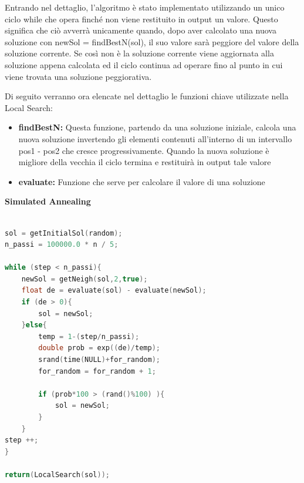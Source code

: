 \documentclass[preprint,12pt]{elsarticle}
\begin{document}
Entrando nel dettaglio, l'algoritmo è stato implementato utilizzando un unico ciclo while che opera finché non viene restituito in output un valore. Questo significa che ciò avverrà unicamente quando, dopo aver calcolato una nuova soluzione con newSol = findBestN(sol), il suo valore sarà peggiore del valore della soluzione corrente. Se così non è la soluzione corrente viene aggiornata alla soluzione appena calcolata ed il ciclo continua ad operare fino al punto in cui viene trovata una soluzione peggiorativa. 

Di seguito verranno ora elencate nel dettaglio le funzioni chiave utilizzate nella Local Search:

\begin{itemize}
\item \textbf{findBestN:} Questa funzione, partendo da una soluzione iniziale, calcola una nuova soluzione invertendo gli elementi contenuti all'interno di un intervallo pos1 - pos2 che cresce progressivamente. Quando la nuova soluzione è migliore della vecchia il ciclo termina e restituirà in output tale valore
\item \textbf{evaluate:} Funzione che serve per calcolare il valore di una soluzione 
\end{itemize}

\begin{large}
\textbf{Simulated Annealing}
\end{large}


\begin{lstlisting}[basicstyle=\small, caption={Simulated Annealing}, frame=single, language=C++]

sol = getInitialSol(random);
n_passi = 100000.0 * n / 5;

while (step < n_passi){
	newSol = getNeigh(sol,2,true);			
	float de = evaluate(sol) - evaluate(newSol);
	if (de > 0){
		sol = newSol;
	}else{ 
		temp = 1-(step/n_passi);	
		double prob = exp((de)/temp);	
		srand(time(NULL)+for_random);		
		for_random = for_random + 1;
		
		if (prob*100 > (rand()%100) ){
			sol = newSol;
		}
	}
step ++; 
}

return(LocalSearch(sol));
	
\end{lstlisting}
\end{document}
